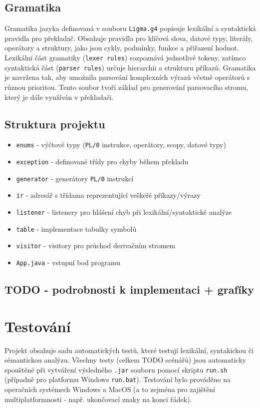 \documentclass[czech, oth, kiv, he, iso690numb, viewonly]{fasthesis}
\begin{document}
\section{Gramatika}
Gramatika jazyka definovaná v souboru \texttt{Ligma.g4} popisuje lexikální a syntaktická pravidla pro překladač. 
Obsahuje pravidla pro klíčová slova, datové typy, literály, operátory a struktury, jako jsou cykly, 
podmínky, funkce a přiřazení hodnot. Lexikální část gramatiky (\texttt{lexer rules}) rozpoznává jednotlivé tokeny, 
zatímco syntaktická část (\texttt{parser rules}) určuje hierarchii a strukturu příkazů. 
Gramatika je navržena tak, aby umožnila parsování komplexních výrazů včetně operátorů s různou prioritou. 
Tento soubor tvoří základ pro generování parsovacího stromu, který je dále využíván v překladači.

\section{Struktura projektu}
\begin{itemize}
    \item \texttt{enums} - výčtové typy (\texttt{PL/0} instrukce, operátory, scopy, datové typy)
    \item \texttt{exception} - definované třídy pro chyby během překladu
    \item \texttt{generator} - generátory \texttt{PL/0} instrukcí 
    \item \texttt{ir} - adresář s třídama reprezentující veškeřé příkazy/výrazy
    \item \texttt{listener} - listenery pro hlášení chyb při lexikální/syntaktické analýze
    \item \texttt{table} - implementace tabulky symbolů
    \item \texttt{visitor} - visitory pro průchod derivačním stromem
    \item \texttt{App.java} - vstupní bod programu
\end{itemize}

\section{TODO - podrobnosti k implementaci + grafíky}

\chapter{Testování}
Projekt obsahuje sadu automatických testů, které testují lexikální, syntakickou či sémantickou analýzu.
Všechny testy (celkem TODO scénářů) jsou automaticky spouštěné při vytváření výsledného
\texttt{.jar} souboru pomocí skriptu \texttt{run.sh} (případně pro platformu Windows \texttt{run.bat}).
Testování bylo prováděno na operačních systémech Windows a MacOS (a to zejména pro zajištění multiplatformnosti - např. ukončovací znaky
na konci řádek).
\end{document}
